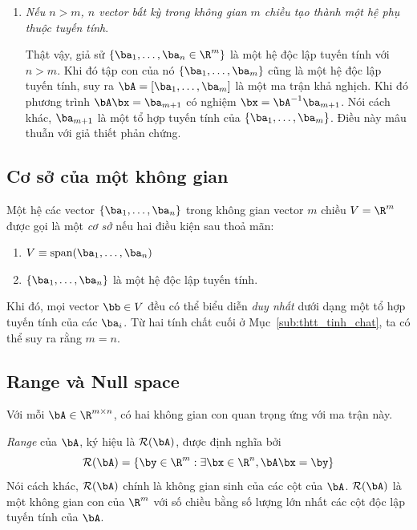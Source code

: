 \begin{enumerate}
    \item \textit{Nếu $n > m$, $n$ vector bất kỳ trong không gian $m$
    chiều tạo thành một hệ phụ thuộc tuyến tính}. 

    Thật vậy, giả sử $\{\ba_1, \dots, \ba_n \in \R^m\} $ là một hệ độc lập tuyến
    tính với $n > m$. Khi đó tập con của nó $\{\ba_1, \dots, \ba_m\}$ cũng là
    một hệ độc lập tuyến tính, suy ra $\bA = [\ba_1, \dots, \ba_m]$ là một ma
    trận khả nghịch. Khi đó phương trình $\bA\bx = \ba_{m+1}$ có nghiệm $\bx =
    \bA^{-1}\ba_{m+1}$. Nói cách khác, $\ba_{m+1}$ là một tổ hợp tuyến tính của
    $\{\ba_1, \dots, \ba_m\}$. Điều này mâu thuẫn với giả thiết phản chứng. \dpcm 

\end{enumerate}

\subsection{Cơ sở của một không gian} %
\label{sub:co_so_cua_mot_khong_gian}
Một hệ các vector $\{\ba_1, \dots, \ba_n\}$ trong không gian vector $m$ chiều $V
= \R^m$ được gọi là một \textit{cơ sở} nếu hai điều kiện sau thoả mãn:
\begin{enumerate}
    \item $V \equiv \text{span}(\ba_1, \dots, \ba_n)$
    \item $\{\ba_1, \dots, \ba_n\}$ là một hệ độc lập tuyến tính.
\end{enumerate}

Khi đó, mọi vector $\bb \in V$ đều có thể biểu diễn \textit{duy nhất} dưới dạng
một tổ hợp tuyến tính của các $\ba_i$. Từ hai tính chất cuối ở Mục~\ref{sub:thtt_tinh_chat}, ta có thể suy ra rằng $m = n$.


\subsection{Range và Null space} %
\label{sub:range_va_null}
Với mỗi $\bA \in \R^{m \times n}$, có hai không gian con quan trọng ứng
với ma trận này.

\textit{Range} của $\bA$, ký hiệu là $\mathcal{R}(\bA)$, được định nghĩa bởi
    \begin{equation}
        \mathcal{R}(\bA) = \{\by \in \R^{m} : \exists \bx \in \R^{n}, \bA\bx
        =\by\}
    \end{equation}
    Nói cách khác, $\mathcal{R}(\bA)$ chính là không gian sinh của các cột của
    $\bA$. $\mathcal{R}(\bA)$ là một không gian con của $\R^m$ với số chiều
    bằng số lượng lớn nhất các cột độc lập tuyến tính của $\bA$.


